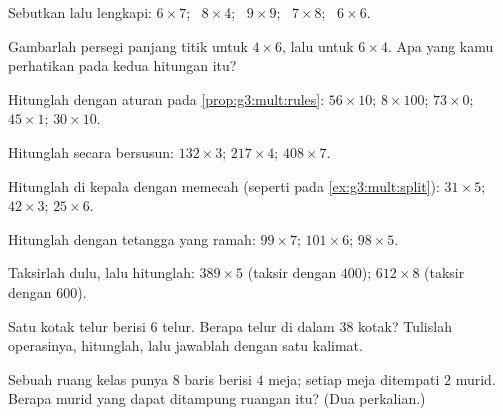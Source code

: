 \begin{exercise}[$\star$]\label{exo:g3:mult:2}
Sebutkan lalu lengkapi: $6 \times 7$; \ $8 \times 4$; \ $9 \times 9$;
\ $7 \times 8$; \ $6 \times 6$.
\end{exercise}

\begin{exercise}[$\star$]\label{exo:g3:mult:3}
Gambarlah persegi panjang titik untuk $4 \times 6$, lalu untuk
$6 \times 4$. Apa yang kamu perhatikan pada kedua hitungan itu?
\end{exercise}

\begin{exercise}[$\star$]\label{exo:g3:mult:4}
Hitunglah dengan aturan pada \cref{prop:g3:mult:rules}:
$56 \times 10$; \quad $8 \times 100$; \quad $73 \times 0$; \quad
$45 \times 1$; \quad $30 \times 10$.
\end{exercise}

\begin{exercise}[$\star$]\label{exo:g3:mult:5}
Hitunglah secara bersusun: $132 \times 3$; \quad $217 \times 4$; \quad
$408 \times 7$.
\end{exercise}

\begin{exercise}[$\star$]\label{exo:g3:mult:6}
Hitunglah di kepala dengan memecah (seperti pada \cref{ex:g3:mult:split}):
$31 \times 5$; \quad $42 \times 3$; \quad $25 \times 6$.
\end{exercise}

\begin{exercise}[$\star$]\label{exo:g3:mult:7}
Hitunglah dengan tetangga yang ramah: $99 \times 7$; \quad
$101 \times 6$; \quad $98 \times 5$.
\end{exercise}

\begin{exercise}[$\star$]\label{exo:g3:mult:8}
Taksirlah dulu, lalu hitunglah: $389 \times 5$ (taksir dengan $400$);
$612 \times 8$ (taksir dengan $600$).
\end{exercise}

\begin{exercise}[$\star$]\label{exo:g3:mult:9}
Satu kotak telur berisi $6$ telur. Berapa telur di dalam $38$ kotak?
Tulislah operasinya, hitunglah, lalu jawablah dengan satu kalimat.
\end{exercise}

\begin{exercise}[$\star\star$]\label{exo:g3:mult:10}
Sebuah ruang kelas punya $8$ baris berisi $4$ meja; setiap meja
ditempati $2$ murid. Berapa murid yang dapat ditampung ruangan itu? (Dua perkalian.)
\end{exercise}

